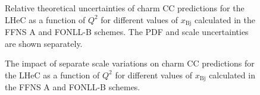 \documentclass[pdftex,twocolumn,epjc3]{svjour3}          %
\newcommand{\xbj}{\ensuremath{x_{\text{Bj}}}\xspace}
\newcommand{\fonll} {{FONLL-B}\xspace}
\newcommand{\ffns} {{FFNS A}\xspace}
\begin{document}
\begin{figure}
    \centering
    \caption{Relative theoretical uncertainties of charm CC predictions for the LHeC as a function of $Q^2$ for different values of \xbj calculated in the \ffns and \fonll schemes. The PDF and scale uncertainties are shown separately.}
    \label{fig:thpred-q2-unc}
\end{figure}

\begin{figure}
    \centering
    \caption{The impact of separate scale variations on charm CC predictions for the LHeC as a function of $Q^2$ for different values of \xbj calculated in the \ffns and \fonll schemes.}
    \label{fig:thpred-q2-varmu}
\end{figure}
\end{document}
